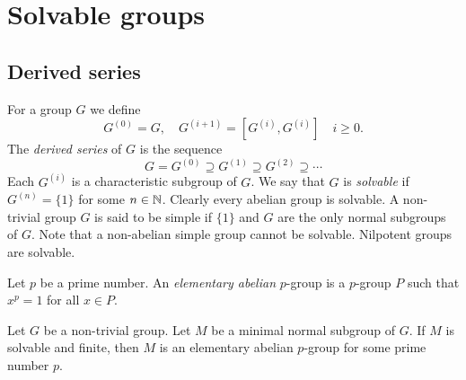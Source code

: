 \chapter{Solvable groups}
\label{solvable}




\section*{Derived series}

For a group $G$ we define 
\[
		G^{(0)}=G,\quad
		G^{(i+1)}=[G^{(i)},G^{(i)}]\quad i\geq0.
\]
The {\em derived series} of $G$ is the sequence 
\[
G=G^{(0)}\supseteq G^{(1)}\supseteq G^{(2)}\supseteq\cdots
\]
Each $G^{(i)}$ is a characteristic subgroup of $G$. We say that 
$G$ is {\em solvable} if $G^{(n)}=\{1\}$ for some  $n\in\mathbb{N}$. Clearly every abelian group
is solvable. A non-trivial group $G$ is said to be simple if $\{ 1\}$ and $G$ are the only normal subgroups of $G$. Note that a non-abelian simple group cannot be solvable. Nilpotent groups
are solvable.


Let $p$ be a prime number. An {\em elementary abelian} $p$-group is a $p$-group 
$P$ such that $x^p=1$ for all $x\in P$.





\begin{lemma}
	\label{lem:minimal_normal}
	Let $G$ be a non-trivial group.
	Let $M$ be a minimal normal subgroup of $G$. If $M$ is solvable and finite, then
	$M$ is an elementary abelian $p$-group for some prime number $p$. 
\end{lemma}

